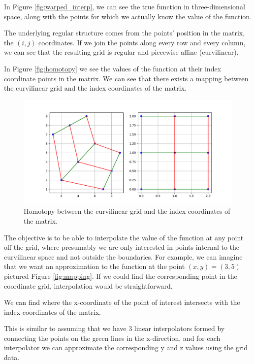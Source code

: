 \documentclass[\econtexRoot/SequentialEGM]{subfiles}
\begin{document}
In Figure \ref{fig:warped_interp}, we can see the true function in three-dimensional space, along with the points for which we actually know the value of the function.

The underlying regular structure comes from the points' position in the matrix, the $(i,j)$ coordinates. If we join the points along every row and every column, we can see that the resulting grid is regular and piecewise affine (curvilinear).

In Figure \ref{fig:homotopy} we see the values of the function at their index coordinate points in the matrix. We can see that there exists a mapping between the curvilinear grid and the index coordinates of the matrix.

\begin{figure}
	\centering
	\includegraphics[width=0.8\linewidth]{Figures/Homotopy.pdf}
	\caption{Homotopy between the curvilinear grid and the index coordinates of the matrix.}
	\notinsubfile{\label{fig:homotopy}}
\end{figure}

The objective is to be able to interpolate the value of the function at any point off the grid, where presumably we are only interested in points internal to the curvilinear space and not outside the boundaries. For example, we can imagine that we want an approximation to the function at the point $(x,y) = (3, 5)$ pictured Figure \ref{fig:mapping}. If we could find the corresponding point in the coordinate grid, interpolation would be straightforward.

We can find where the x-coordinate of the point of interest intersects with the index-coordinates of the matrix.

This is similar to assuming that we have 3 linear interpolators formed by connecting the points on the green lines in the x-direction, and for each interpolator we can approximate the corresponding y and z values using the grid data.
\end{document}
